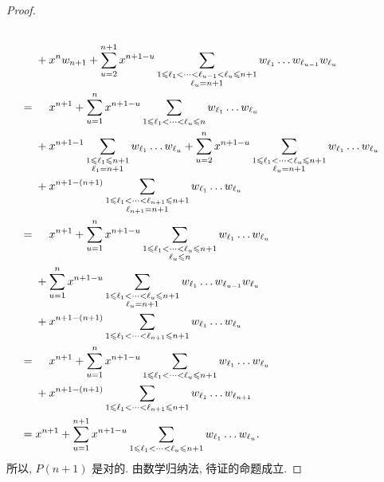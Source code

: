 \documentclass[../libro.tex]{subfiles}
\begin{document}
\begin{proof}
\begin{align*}
{        }
        \\
        &
        {} +
        x^n w_{n+1} + \sum_{u = 2}^{n+1} {x^{n+1-u}
            \sum_{\substack{
                    1 \leq \ell_1 < \dots < \ell_{u-1} < \ell_u \leq n+1 \\
                    \ell_u = n + 1
            }}
            {w_{\ell_1} \dots w_{\ell_{u-1}} w_{\ell_u}}
        }
        \\
        = {} &
        \hphantom{{} + {}}
        x^{n+1} + \sum_{u = 1}^{n} {x^{n+1-u}
            \sum_{1 \leq \ell_1 < \dots < \ell_u \leq n}
            {w_{\ell_1} \dots w_{\ell_u}}
        }
        \\
        &
        {}
        + x^{n+1-1}
        \sum_{\substack{
                1 \leq \ell_1 \leq n+1 \\
                \ell_1 = n + 1
        }}
        {w_{\ell_1} \dots w_{\ell_u}}
        + \sum_{u = 2}^{n} {x^{n+1-u}
            \sum_{\substack{
                    1 \leq \ell_1 < \dots < \ell_u \leq n+1 \\
                    \ell_u = n + 1
            }}
            {w_{\ell_1} \dots w_{\ell_u}}
        }
        \\
        &
        {}
        + x^{n+1-(n+1)} \sum_{\substack{
                1 \leq \ell_1 < \dots < \ell_{n+1} \leq n+1 \\
                \ell_{n+1} = n + 1
        }}
        {w_{\ell_1} \dots w_{\ell_u}}
        \\
        = {} &
        \hphantom{{} + {}}
        x^{n+1} + \sum_{u = 1}^{n} {x^{n+1-u}
            \sum_{\substack{
                    1 \leq \ell_1 < \dots < \ell_u \leq n+1 \\
                    \ell_u \leq n
            }}
            {w_{\ell_1} \dots w_{\ell_u}}
        }
        \\
        &
        {} +
        \sum_{u = 1}^{n} {x^{n+1-u}
            \sum_{\substack{
                    1 \leq \ell_1 < \dots < \ell_u \leq n+1 \\
                    \ell_u = n + 1
            }}
            {w_{\ell_1} \dots w_{\ell_{u-1}} w_{\ell_u}}
        }
        \\
        &
        {} +
        x^{n+1-(n+1)}
        \sum_{1 \leq \ell_1 < \dots < \ell_{n+1} \leq n+1}
        {w_{\ell_1} \dots w_{\ell_u}}
        \\
        = {} &
        \hphantom{{} + {}}
        x^{n+1} + \sum_{u = 1}^{n} {x^{n+1-u}
            \sum_{1 \leq \ell_1 < \dots < \ell_u \leq n+1}
            {w_{\ell_1} \dots w_{\ell_u}}
        }
        \\
        &
        {} +
        x^{n+1-(n+1)}
        \sum_{1 \leq \ell_1 < \dots < \ell_{n+1} \leq n+1}
        {w_{\ell_1} \dots w_{\ell_{n+1}}}
        \\
        = {} &
        x^{n+1} + \sum_{u = 1}^{n+1} {x^{n+1-u}
            \sum_{1 \leq \ell_1 < \dots < \ell_u \leq n+1}
            {w_{\ell_1} \dots w_{\ell_u}}
        }.
    \end{align*}
    所以, \(P(n+1)\) 是对的.
    由数学归纳法, 待证的命题成立.
\end{proof}
\end{document}
